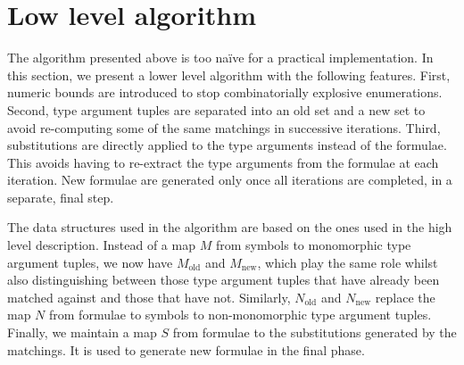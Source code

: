 \documentclass[runningheads]{llncs}
\begin{document}
\section{Low level algorithm}
\label{sec:low-level-algorithm}

The algorithm presented above is too naïve for a practical implementation. In this section, we present a lower level algorithm with the following features.
First, numeric bounds are introduced to stop combinatorially explosive enumerations.
Second, type argument tuples are separated into an old set and a new set to avoid re-computing some of the same matchings in successive iterations.
Third, substitutions are directly applied to the type arguments instead of the formulae. This avoids having to re-extract the type arguments from the formulae at each iteration. New formulae are generated only once all iterations are completed, in a separate, final step.

The data structures used in the algorithm are based on the ones used in the high level description. Instead of a map \(M\) from symbols to monomorphic type argument tuples, we now have \(M_\text{old}\) and \(M_\text{new}\), which play the same role whilst also distinguishing between those type argument tuples that have already been matched against and those that have not. Similarly, \(N_\text{old}\) and \(N_\text{new}\) replace the map \(N\) from formulae to symbols to non-monomorphic type argument tuples. Finally, we maintain a map \(S\) from formulae to the substitutions generated by the matchings. It is used to generate new formulae in the final phase.
\end{document}
